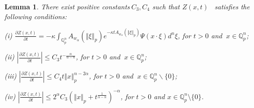 \documentclass{amsart}\usepackage{amsfonts}
\theoremstyle{plain}
\newtheorem{lemma}[theorem]{Lemma}
\numberwithin{equation}{section}
\begin{document}
\begin{lemma}
\label{lemmaZ'} There exist positive constants$\ C_{3},C_{4}$ such that
$Z(x,t)$ \ satisfies the following conditions:

(i) $\frac{\partial Z(x,t)}{\partial t}=-\kappa{\textstyle\int\nolimits_{\mathbb{Q}_{p}^{n}}}
A_{w_{\alpha}}(\left\Vert \xi\right\Vert _{p})e^{-\kappa tA_{w_{\alpha}}(\left\Vert \xi\right\Vert _{p})}\Psi(x\cdot\xi)d^{n}\xi$, for $t>0$ and
$\ x\in\mathbb{Q}_{p}^{n}$;

(ii) $\left\vert \frac{\partial Z(x,t)}{\partial t}\right\vert \leq
C_{3}t^{-\frac{\alpha}{\alpha-n}}$, for $t>0$ and $\ x\in\mathbb{Q}_{p}^{n}$;

(iii) $\left\vert \frac{\partial Z(x,t)}{\partial t}\right\vert \leq
C_{4}t\left\Vert x\right\Vert _{p}^{n-2\alpha}$, for $t>0$ and $\ x\in
\mathbb{Q}_{p}^{n}\backslash\{0\}$;

(iv) $\left\vert \frac{\partial Z(x,t)}{\partial t}\right\vert \leq2^{\alpha
}C_{3}\left(  \left\Vert x\right\Vert _{p}+t^{\frac{1}{\alpha-n}}\right)
^{-\alpha}$, for $t>0$ and $x\in\mathbb{Q}_{p}^{n}\setminus\{0\}$.


\end{lemma}
\end{document}
